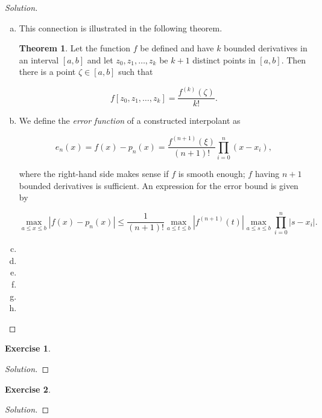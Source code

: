 \documentclass[12pt,a4]{article}
\theoremstyle{definition}
\newtheorem*{theorem*}{Theorem}
\newtheorem{exercise}{Exercise}
\begin{document}
\begin{proof}[Solution]
\begin{enumerate}[(a)]
		\item This connection is illustrated in the following theorem. 
		
		\begin{theorem*}
			Let the function $f$ be defined and have $k$ bounded derivatives in an interval $[a, b]$ and let $z_0, z_1, \ldots, z_k$ be $k + 1$ distinct points in $[a, b]$. Then there is a point $\zeta \in [a, b]$ such that 
			
			\[
			f[z_0, z_1, \ldots, z_k] = \frac{f^{(k)}(\zeta)}{k!} {.}
			\]
		\end{theorem*}
		
		\item We define the \emph{error function} of a constructed interpolant as 
		
		\[
		e_n(x) = f(x) - p_n(x) = \frac{f^{(n + 1)} (\xi)}{(n + 1)!} \prod_{i = 0}^n (x - x_i) {,}
		\]
		
		where the right-hand side makes sense if $f$ is smooth enough; $f$ having $n + 1$ bounded derivatives is sufficient. An expression for the error bound is given by
		
		\[
		\max_{a \leq x \leq b} |f(x) - p_n(x)| \leq \frac{1}{(n + 1)!} \max_{a \leq t \leq b} |f^{(n + 1)}(t)| \max_{a \leq s \leq b} \prod_{i = 0}^{n} |s - x_i| {.}
		\]
		
		\item 
		
		\item 
		
		\item 
		
		\item 
		
		\item 
		
		\item 
	\end{enumerate}
\end{proof}

\begin{exercise}
	
\end{exercise}
\begin{proof}[Solution]
	
\end{proof}

\begin{exercise}
	 
\end{exercise}
\begin{proof}[Solution]
	
\end{proof}
\end{document}
